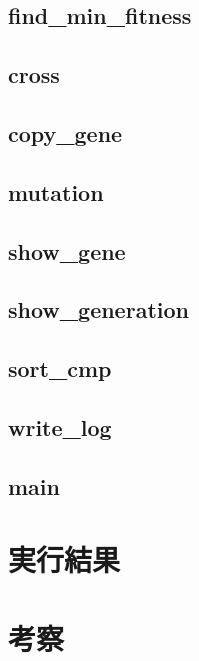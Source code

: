 \documentclass{jsarticle}
\begin{document}
\subsection{find\_min\_fitness}
\subsection{cross}
\subsection{copy\_gene}
\subsection{mutation}
\subsection{show\_gene}
\subsection{show\_generation}
\subsection{sort\_cmp}
\subsection{write\_log}
\subsection{main}
\section{実行結果}
\section{考察}
\end{document}
